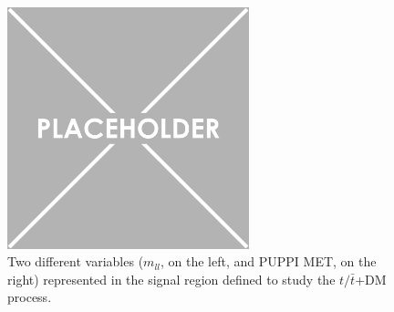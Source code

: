 \documentclass[a4paper, 10pt, openright]{report}
\begin{document}
\begin{figure}[htbp]
{\begin{minipage}[b]{.48\textwidth}
\end{minipage}\hfill
\begin{minipage}[b]{.48\textwidth}
\includegraphics[width=7cm, height=7cm]{figs/placeholder.png}
\end{minipage} \hfill
}
\caption{Two different variables ($m_{ll}$, on the left, and \ac{PUPPI} \ac{MET}, on the right) represented in the signal region defined to study the $t/ \bar t$+DM process.}
\label{fig:SingleSR}
\end{figure}
\end{document}

